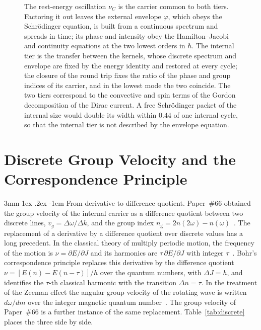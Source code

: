 \documentclass[%
 reprint, amsmath,amssymb, aps, prb, ]{revtex4-2}
\makeatletter
\numberwithin{equation}{section}
\renewcommand\paragraph{%
  \@startsection{paragraph}{4}{\z@}%
    {3mm \@plus 1ex \@minus .2ex}%
    {-1em}%
    {\normalfont\normalsize\itshape}}
\newcommand{\ngr}{n_{\mathrm{g}}}
\makeatother
\begin{document}
\begin{figure}[t!]
\begin{minipage}{0.95\textwidth}
The rest-energy oscillation $\nu_C$ is the carrier common to both tiers. Factoring it out leaves the external envelope $\varphi$, which obeys the Schr\"odinger equation, is built from a continuous spectrum and spreads in time; its phase and intensity obey the Hamilton--Jacobi and continuity equations at the two lowest orders in $\hbar$. The internal tier is the transfer between the kernels, whose discrete spectrum and envelope are fixed by the energy identity and restored at every cycle; the closure of the round trip fixes the ratio of the phase and group indices of its carrier, and in the lowest mode the two coincide. The two tiers correspond to the convective and spin terms of the Gordon decomposition of the Dirac current. A free Schr\"odinger packet of the internal size would double its width within $0.44$ of one internal cycle, so that the internal tier is not described by the envelope equation.
\end{minipage}
\end{figure}

\section{Discrete Group Velocity and the Correspondence Principle}
\label{sec:discrete}

\paragraph{From derivative to difference quotient.} Paper~\#66 obtained the group velocity of the internal carrier as a difference quotient between two discrete lines, $v_g = \Delta\omega/\Delta k$, and the group index $\ngr = 2n(2\omega) - n(\omega)$~\cite{H66}. The replacement of a derivative by a difference quotient over discrete values has a long precedent. In the classical theory of multiply periodic motion, the frequency of the motion is $\nu = \partial E/\partial J$ and its harmonics are $\tau\,\partial E/\partial J$ with integer $\tau$~\cite{Yukawa1954}. Bohr's correspondence principle replaces this derivative by the difference quotient $\nu = [E(n) - E(n - \tau)]/h$ over the quantum numbers, with $\Delta J = h$, and identifies the $\tau$-th classical harmonic with the transition $\Delta n = \tau$. In the treatment of the Zeeman effect the angular group velocity of the rotating wave is written $d\omega/dm$ over the integer magnetic quantum number~\cite{Yukawa1954}. The group velocity of Paper~\#66 is a further instance of the same replacement. Table~\ref{tab:discrete} places the three side by side.
\end{document}

